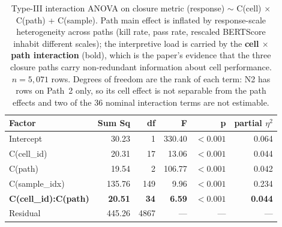\begin{table}[!htbp]
\centering
\caption{Type-III interaction ANOVA on closure metric (response) $\sim$ C(cell) $\times$ C(path) + C(sample). Path main effect is inflated by response-scale heterogeneity across paths (kill rate, pass rate, rescaled BERTScore inhabit different scales); the interpretive load is carried by the \textbf{cell $\times$ path interaction} (bold), which is the paper's evidence that the three closure paths carry non-redundant information about cell performance. $n = 5{,}071$ rows. Degrees of freedom are the rank of each term: N2 has rows on Path~2 only, so its cell effect is not separable from the path effects and two of the 36 nominal interaction terms are not estimable.}
\label{tab:anova_interaction}
\begin{tabular}{@{}lrrrrr@{}}
\toprule
Factor & Sum Sq & df & F & p & partial $\eta^2$ \\
\midrule
Intercept & 30.23 & 1 & 330.40 & $<0.001$ & 0.064 \\
C(cell\_id) & 20.31 & 17 & 13.06 & $<0.001$ & 0.044 \\
C(path) & 19.54 & 2 & 106.77 & $<0.001$ & 0.042 \\
C(sample\_idx) & 135.76 & 149 & 9.96 & $<0.001$ & 0.234 \\
\textbf{C(cell\_id):C(path)} & \textbf{20.51} & \textbf{34} & \textbf{6.59} & $\boldsymbol{<0.001}$ & \textbf{0.044} \\
Residual & 445.26 & 4867 & --- & --- & --- \\
\bottomrule
\end{tabular}
\end{table}
